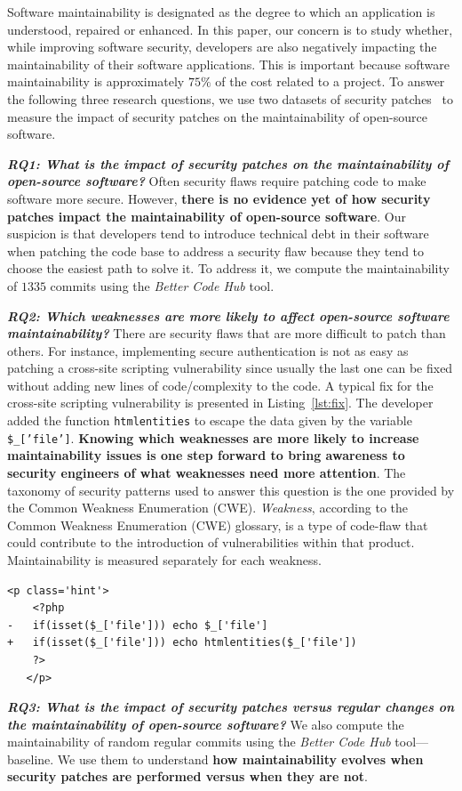 \documentclass[smallextended]{svjour3}       %
\newcounter{lstannotation}
\begin{document}
Software maintainability is designated as the degree to which an application is understood, 
repaired or enhanced. In this paper, our concern is to study whether, while improving software
security, developers are also negatively impacting the maintainability of their
software applications. This is important because software maintainability is 
approximately $75\%$ of the cost related to a project. To answer the following three 
research questions, we use two datasets of security patches~\cite{Reis:2017:IJSSE,10.1109/MSR.2019.00064} 
to measure the impact of security patches on the maintainability of open-source software. 
%

\textit{\textbf{RQ1: What is the impact of security patches on the
maintainability of open-source software?}} Often security flaws require patching 
code to make software more secure.
However, \textbf{there is no evidence yet of how security patches impact the
maintainability of open-source software}. Our suspicion is that developers tend
to introduce technical debt in their software when patching the code base to
address a security flaw because they tend to choose the easiest path to solve
it. To address it, we compute the maintainability of $1335$ commits using the
\emph{Better Code Hub} tool. 

\textit{\textbf{RQ2: Which weaknesses are more likely to
affect open-source software maintainability?}}
There are security flaws that are more difficult to patch than others. For
instance, implementing secure authentication is not as easy as patching a
cross-site scripting vulnerability since usually the last one can be fixed
without adding new lines of code/complexity to the code. A typical fix for 
the cross-site scripting vulnerability is presented in Listing~\ref{lst:fix}. 
The developer added the function \texttt{htmlentities} to escape the data given by the variable
\texttt{\$\_['file']}. \textbf{Knowing which weaknesses are more likely to increase
maintainability issues is one step forward to bring awareness to security
engineers of what weaknesses need more attention}. The taxonomy of security
patterns used to answer this question is the one provided by the Common Weakness Enumeration
(CWE). \emph{Weakness}, according to the Common Weakness Enumeration (CWE) glossary, 
is a type of code-flaw that could contribute to the 
introduction of vulnerabilities within that product. Maintainability is measured
separately for each weakness.
%
\setcounter{lstannotation}{0}
\begin{lstlisting}[style={PHPStyle}, caption={Fix provided by \texttt{nextcloud/server} developers to a \\Cross-Site Scripting vulnerability},label={lst:fix}]
   <p class='hint'>
    <?php
-   if(isset($_['file'])) echo $_['file']
+   if(isset($_['file'])) echo htmlentities($_['file'])
    ?>
   </p>
\end{lstlisting}
%
\textit{\textbf{RQ3: What is the impact of security patches versus regular changes on the
maintainability of open-source software?}}
%
We also compute the maintainability of random regular commits using the
\emph{Better Code Hub} tool---baseline.  We use them to understand \textbf{how
maintainability evolves when security patches are performed versus when
they are not}.
%
\end{document}
